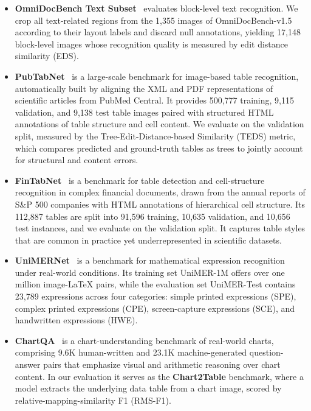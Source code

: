 \begin{itemize}[
  leftmargin=1.0em,
  labelsep=0.5em
]
    \item \textbf{OmniDocBench Text Subset}~\cite{ouyang2025omnidocbench} evaluates block-level text recognition. We crop all text-related regions from the 1,355 images of OmniDocBench-v1.5 according to their layout labels and discard null annotations, yielding 17,148 block-level images whose recognition quality is measured by edit distance similarity (EDS).

    \item \textbf{PubTabNet}~\cite{pubtabnet} is a large-scale benchmark for image-based table recognition, automatically built by aligning the XML and PDF representations of scientific articles from PubMed Central. It provides 500,777 training, 9,115 validation, and 9,138 test table images paired with structured HTML annotations of table structure and cell content. We evaluate on the validation split, measured by the Tree-Edit-Distance-based Similarity (TEDS) metric, which compares predicted and ground-truth tables as trees to jointly account for structural and content errors.

    \item \textbf{FinTabNet}~\cite{fintabnet} is a benchmark for table detection and cell-structure recognition in complex financial documents, drawn from the annual reports of S\&P 500 companies with HTML annotations of hierarchical cell structure. Its 112,887 tables are split into 91,596 training, 10,635 validation, and 10,656 test instances, and we evaluate on the validation split. It captures table styles that are common in practice yet underrepresented in scientific datasets.

    \item \textbf{UniMERNet}~\cite{wang2024unimernet} is a benchmark for mathematical expression recognition under real-world conditions. Its training set UniMER-1M offers over one million image-LaTeX pairs, while the evaluation set UniMER-Test contains 23,789 expressions across four categories: simple printed expressions (SPE), complex printed expressions (CPE), screen-capture expressions (SCE), and handwritten expressions (HWE).

    \item \textbf{ChartQA}~\cite{masry2022chartqa} is a chart-understanding benchmark of real-world charts, comprising 9.6K human-written and 23.1K machine-generated question-answer pairs that emphasize visual and arithmetic reasoning over chart content. In our evaluation it serves as the \textbf{Chart2Table} benchmark, where a model extracts the underlying data table from a chart image, scored by relative-mapping-similarity F1 (RMS-F1).


\end{itemize}
